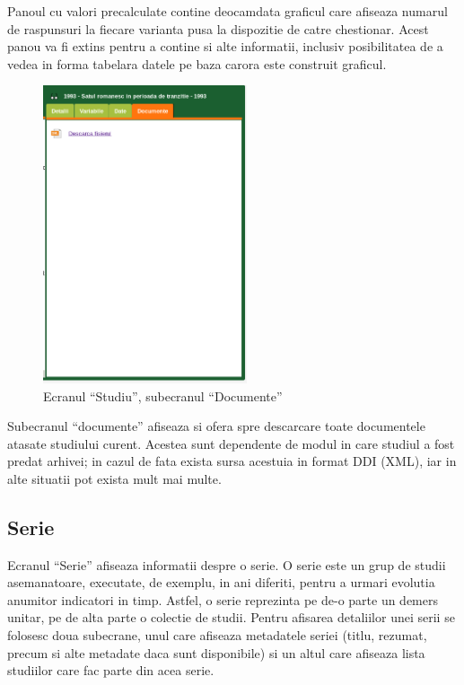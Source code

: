 Panoul cu valori precalculate contine deocamdata graficul care afiseaza
numarul de raspunsuri la fiecare varianta pusa la dispozitie de catre
chestionar. Acest panou va fi extins pentru a contine si alte informatii,
inclusiv posibilitatea de a vedea in forma tabelara datele pe baza
carora este construit graficul. 

\begin{figure}[H]
\begin{centering}
\includegraphics[width=6cm]{screenshots/details-panel-study-documente}
\par\end{centering}
\caption{Ecranul ``Studiu'', subecranul ``Documente''}
\end{figure}

Subecranul ``documente'' afiseaza si ofera spre descarcare toate
documentele atasate studiului curent. Acestea sunt dependente de modul
in care studiul a fost predat arhivei; in cazul de fata exista 
sursa acestuia in format DDI (XML), iar in alte situatii pot exista
mult mai multe.

\subsection{Serie}
Ecranul ``Serie'' afiseaza informatii despre o serie. O serie este
un grup de studii asemanatoare, executate, de exemplu, in ani diferiti,
pentru a urmari evolutia anumitor indicatori in timp. Astfel, o serie
reprezinta pe de-o parte un demers unitar, pe de alta parte o colectie
de studii. Pentru afisarea detaliilor unei serii se folosesc doua
subecrane, unul care afiseaza metadatele seriei (titlu, rezumat, precum
si alte metadate daca sunt disponibile) si un altul care afiseaza
lista studiilor care fac parte din acea serie. 

